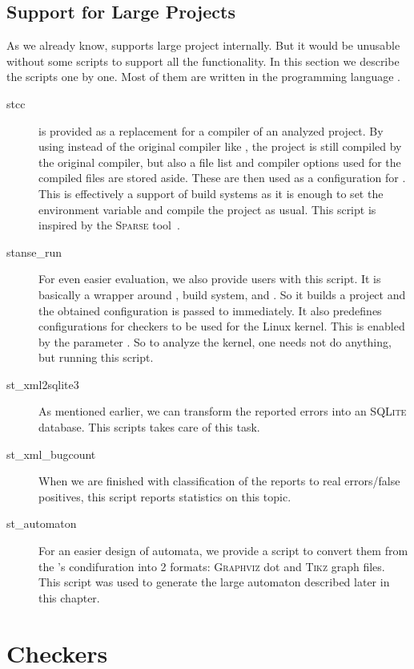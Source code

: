 \subsection*{Support for Large Projects}
As we already know, \stan supports large project internally. But it would be
unusable without some scripts to support all the functionality. In this
section we describe the scripts one by one. Most of them are written in the
programming language \perl.

\begin{description}
\item[\textsf{stcc}]  is provided as a replacement for a compiler
of an analyzed project. By using  instead of the original compiler
like \gcc, the project is still compiled by the original compiler, but also a
file list and compiler options used for the compiled files are stored aside.
These are then used as a configuration for \stan. This is effectively a
support of build systems as it is enough to set the environment variable
 and compile the project as usual.  This script is inspired by
the \textsc{Sparse} tool~\cite{sparse}.

\item[\textsf{stanse\_run}] For even easier evaluation, we also provide users
with this script. It is basically a wrapper around , build system,
and \stan. So it builds a project and the obtained configuration is passed to
\stan immediately. It also predefines configurations for checkers to be used
for the Linux kernel. This is enabled by the parameter . So to analyze
the kernel, one needs not do anything, but running this script.
\item[\textsf{st\_xml2sqlite3}] As mentioned earlier, we can transform the
reported errors into an \textsc{SQLite} database. This scripts takes care of
this task.
\item[\textsf{st\_xml\_bugcount}] When we are finished with classification of
the reports to real errors/false positives, this script reports statistics on
this topic.
\item[\textsf{st\_automaton}] For an easier design of automata, we provide a
script to convert them from the \stan's condifuration into 2 formats:
\textsc{Graphviz} dot and \textsc{Tikz} graph files. This script was used to
generate the large automaton described later in this chapter.
\end{description}


\section{Checkers}\label{sec:checkers}

